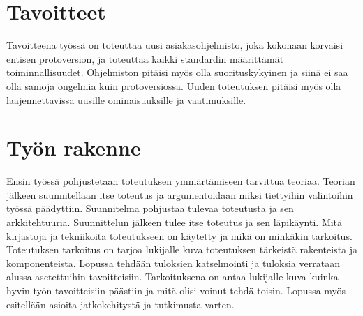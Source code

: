 \section{Tavoitteet}

Tavoitteena työssä on toteuttaa uusi asiakasohjelmisto, joka kokonaan korvaisi entisen protoversion, ja toteuttaa kaikki standardin määrittämät toiminnallisuudet. Ohjelmiston pitäisi myös olla suorituskykyinen ja siinä ei saa olla samoja ongelmia kuin protoversiossa. Uuden toteutuksen pitäisi myös olla laajennettavissa uusille ominaisuuksille ja vaatimuksille.

\section{Työn rakenne}

Ensin työssä pohjustetaan toteutuksen ymmärtämiseen tarvittua teoriaa. Teorian jälkeen suunnitellaan itse toteutus ja argumentoidaan miksi tiettyihin valintoihin työssä päädyttiin. Suunnitelma pohjustaa tulevaa toteutusta ja sen arkkitehtuuria. Suunnittelun jälkeen tulee itse toteutus ja sen läpikäynti. Mitä kirjastoja ja tekniikoita toteutukseen on käytetty ja mikä on minkäkin tarkoitus. Toteutuksen tarkoitus on tarjoa lukijalle kuva toteutuksen tärkeistä rakenteista ja komponenteista. Lopussa tehdään tuloksien katselmointi ja tuloksia verrataan alussa asetettuihin tavoitteisiin. Tarkoituksena on antaa lukijalle kuva kuinka hyvin työn tavoitteisiin päästiin ja mitä olisi voinut tehdä toisin. Lopussa myös esitellään asioita jatkokehitystä ja tutkimusta varten.